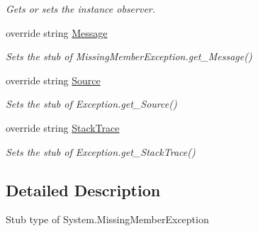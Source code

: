 \begin{DoxyCompactItemize}
\begin{DoxyCompactList}\small\item\em Gets or sets the instance observer.\end{DoxyCompactList}\item 
override string \hyperlink{class_system_1_1_fakes_1_1_stub_missing_member_exception_aa5c9e6bc473f3946df6be1393a7732f9}{Message}
\begin{DoxyCompactList}\small\item\em Sets the stub of Missing\-Member\-Exception.\-get\-\_\-\-Message()\end{DoxyCompactList}\item 
override string \hyperlink{class_system_1_1_fakes_1_1_stub_missing_member_exception_a953ee210396eac9dd64cd554d87f422b}{Source}
\begin{DoxyCompactList}\small\item\em Sets the stub of Exception.\-get\-\_\-\-Source()\end{DoxyCompactList}\item 
override string \hyperlink{class_system_1_1_fakes_1_1_stub_missing_member_exception_a11403c1ee83ac74ede261d144a082d8c}{Stack\-Trace}
\begin{DoxyCompactList}\small\item\em Sets the stub of Exception.\-get\-\_\-\-Stack\-Trace()\end{DoxyCompactList}\end{DoxyCompactItemize}


\subsection{Detailed Description}
Stub type of System.\-Missing\-Member\-Exception



